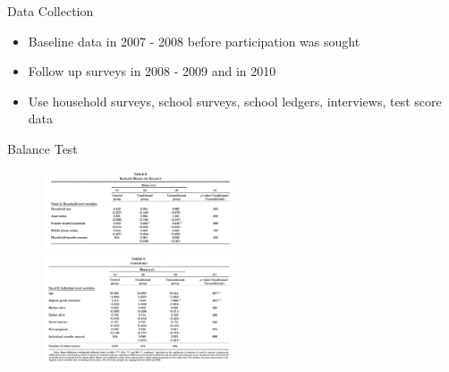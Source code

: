 \documentclass[11pt,notes=hide,aspectratio=169,mathserif]{beamer}
\begin{document}
\begin{frame}{Data Collection}
\begin{itemize}
\item Baseline data in 2007 - 2008 before participation was sought 
\item Follow up surveys in 2008 - 2009 and in 2010 
\item Use household surveys, school surveys, school ledgers, interviews, test score data 
\end{itemize}
\end{frame}

\begin{frame}{Balance Test}
\begin{figure}
\centering
\includegraphics[width=0.5\textwidth]{inputs/table4.png}\\
\vspace{0.0cm} 
\includegraphics[width=0.5\textwidth]{inputs/table5.png}
\end{figure}
\end{frame}
\end{document}
